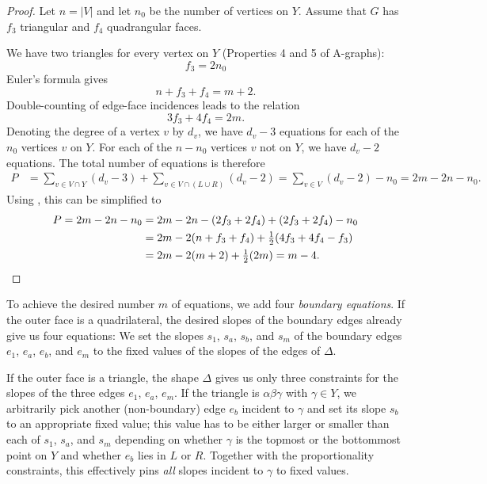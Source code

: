 \begin{proof}
Let $n=|V|$ and let $n_0$ be the number
of vertices on $Y$. Assume that $G$ has $f_3$ triangular and $f_4$
quadrangular faces.

We have two triangles for every vertex on $Y$ (Properties 4 and 5 of A-graphs):
\begin{equation}
\label{eq:f3}
f_3 = 2n_0
\end{equation}
Euler's formula gives
\begin{equation}
\label{eq:Euler}
n + f_3+f_4 = m+2.
\end{equation}
Double-counting of edge-face incidences leads to the relation
\begin{equation}
\label{eq:edge-face}
3f_3+4f_4=2m.
\end{equation}
Denoting the degree of a vertex $v$ by $d_v$,
we have $d_v-3$ equations for each of the $n_0$ vertices $v$ on $Y$. For each of the 
$n-n_0$ vertices $v$ not on $Y$, 
we have $d_v-2$ equations.
The total number of equations is therefore
\begin{align*}
P &= 
\sum_{v\in V\cap Y}(d_v-3)+
\sum_{v\in V\cap(L\cup R)}(d_v-2)
=
\sum_{v\in V}(d_v-2)-n_0
=
2m-2n-n_0.
\end{align*}
Using \thetag{\ref{eq:f3}--\ref{eq:edge-face}}, this can be
simplified to
\begin{align*}
  P%
      =
   2m-2n-n_0%
 &
                 = 2m -2n -(2f_3+2f_4) +(2f_3+2f_4)-n_0\\
&= 2m -2(n +f_3+f_4) +\tfrac12(4f_3+4f_4-f_3)\\
 &= 2m -2(m+2) +\tfrac12(2m) = m-4.
   \qedhere
\end{align*}
\end{proof}

To achieve the desired number $m$ of equations, we add
four \emph{boundary equations}.  If the outer face is a quadrilateral,
the desired slopes of the boundary edges already give us four equations:
We set
the slopes $s_1$, $s_a$, $s_b$, and $s_m$ of the boundary edges $e_1$, $e_a$,
$e_b$, and $e_m$ to the fixed values of the slopes of the edges of
$\Delta$.

If the outer face is a triangle, the shape $\Delta$ gives us
only three constraints for the slopes of the three edges $e_1$, $e_a$,
$e_m$.  If the triangle is $\alpha\beta\gamma$ with $\gamma\in Y$,
we arbitrarily pick another (non-boundary) edge $e_b$ incident to $\gamma$
and set its slope $s_b$ to an appropriate fixed value; this value has
to be either larger or smaller than each of $s_1$, $s_a$, and $s_m$
depending on whether $\gamma$ is the topmost or the bottommost point
on $Y$ and whether $e_b$ lies in $L$ or $R$. Together with the
proportionality constraints, this effectively pins \emph{all} slopes
incident to $\gamma$ to fixed values.

